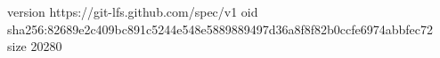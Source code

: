 version https://git-lfs.github.com/spec/v1
oid sha256:82689e2c409bc891c5244e548e5889889497d36a8f8f82b0ccfe6974abbfec72
size 20280
